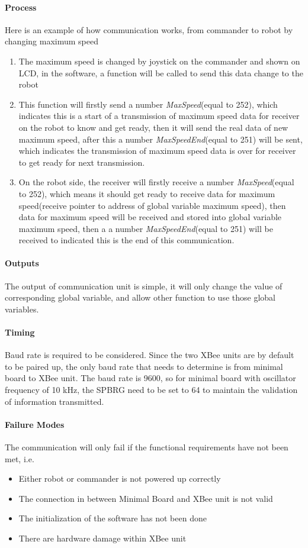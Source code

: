 \documentclass[MTRX3700report.tex]{subfiles}
\begin{document}
\paragraph{Process}
Here is an example of how communication works, from commander to robot by changing maximum speed
\begin{enumerate}
\item The maximum speed is changed by joystick on the commander and shown on LCD, in the software, a function will be called to send this data change to the robot
\item This function will firstly send a number \textit{MaxSpeed}(equal to 252), which indicates this is a start of a transmission of maximum speed data for receiver on the robot to know and get ready, then it will send the real data of new maximum speed, after this a number \textit{MaxSpeedEnd}(equal to 251) will be sent, which indicates the transmission of maximum speed data is over for receiver to get ready for next transmission.
\item On the robot side, the receiver will firstly receive a number \textit{MaxSpeed}(equal to 252), which means it should get ready to receive data for maximum speed(receive pointer to address of global variable maximum speed), then data for maximum speed will be received and stored into global variable maximum speed, then a a number \textit{MaxSpeedEnd}(equal to 251) will be received to indicated this is the end of this communication.
\end{enumerate}

\paragraph{Outputs}
The output of communication unit is simple, it will only change the value of corresponding global variable, and allow other function to use those global variables.

\paragraph{Timing}
Baud rate is required to be considered. Since the two XBee units are by default to be paired up, the only baud rate that needs to determine is from minimal board to XBee unit. The baud rate is 9600, so for minimal board with oscillator frequency of 10 kHz, the SPBRG need to be set to 64 to maintain the validation of information transmitted. 

\paragraph{Failure Modes}
The communication will only fail if the functional requirements have not been met, i.e.
\begin{itemize}
\item Either robot or commander is not powered up correctly
\item The connection in between Minimal Board and XBee unit is not valid 
\item	The initialization of the software has not been done
\item There are hardware damage within XBee unit
\end{itemize}
\end{document}
